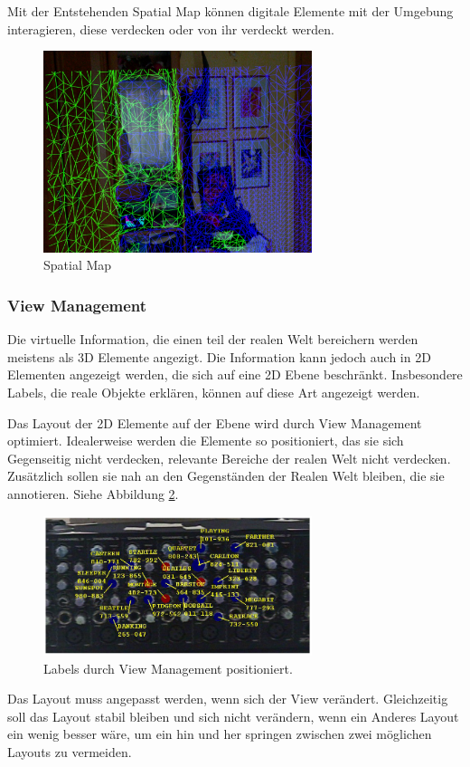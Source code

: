Mit der Entstehenden Spatial Map können digitale Elemente mit der Umgebung interagieren, diese verdecken oder von ihr verdeckt werden.\citep{spatialMapping} 

\begin{figure}[H]
	\centering
	\includegraphics[width=0.7\textwidth]{images/ML_20201003_15.36.42.jpg}
	\caption[]{Spatial Map}
	\label{img:spatialmap}
\end{figure}

\subsubsection{View Management}
Die virtuelle Information, die einen teil der realen Welt bereichern werden meistens als 3D Elemente angezigt. 
Die Information kann jedoch auch in 2D Elementen angezeigt werden, die sich auf eine 2D Ebene beschränkt. Insbesondere Labels, die reale Objekte erklären, können auf diese Art angezeigt werden.

Das Layout der 2D Elemente auf der Ebene wird durch View Management optimiert.
Idealerweise werden die Elemente so positioniert, das sie sich Gegenseitig nicht verdecken, relevante Bereiche der realen Welt nicht verdecken.
Zusätzlich sollen sie nah an den Gegenständen der Realen Welt bleiben, die sie annotieren. Siehe Abbildung \ref{viewManagement}.

\begin{figure}[H]
	\centering
	\includegraphics[width=0.7\textwidth]{images/ViewManagementImageFromPaper.PNG}
	\caption[]{Labels durch View Management positioniert.\citep{viewmanagement}}
	\label{viewManagement}
\end{figure}
Das Layout muss angepasst werden, wenn sich der View verändert. Gleichzeitig soll das Layout stabil bleiben und sich nicht verändern, wenn ein Anderes Layout ein wenig besser wäre, um ein hin und her springen zwischen zwei möglichen Layouts zu vermeiden.\citep{viewmanagement}

